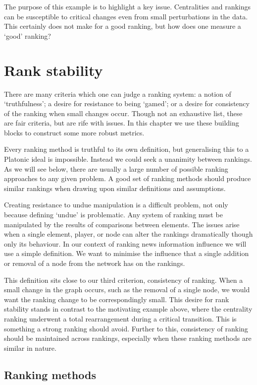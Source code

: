 The purpose of this example is to highlight a key issue. Centralities and rankings can be susceptible to critical changes even from small perturbations in the data. This certainly does not make for a good ranking, but how does one measure a `good' ranking?


\section{Rank stability}

There are many criteria which one can judge a ranking system: a notion of `truthfulness'; a desire for resistance to being `gamed'; or a desire for consistency of the ranking when small changes occur. Though not an exhaustive list, these are fair criteria, but are rife with issues. In this chapter we use these building blocks to construct some more robust metrics.

Every ranking method is truthful to its own definition, but generalising this to a Platonic ideal is impossible. Instead we could seek a unanimity between rankings. As we will see below, there are usually a large number of possible ranking approaches to any given problem. A good set of ranking methods should produce similar rankings when drawing upon similar definitions and assumptions.

Creating resistance to undue manipulation is a difficult problem, not only because defining `undue' is problematic. Any system of ranking must be manipulated by the results of comparisons between elements. The issues arise when a single element, player, or node can alter the rankings dramatically though only its behaviour. In our context of ranking news information influence we will use a simple definition. We want to minimise the influence that a single addition or removal of a node from the network has on the rankings.

This definition sits close to our third criterion, consistency of ranking. When a small change in the graph occurs, such as the removal of a single node, we would want the ranking change to be correspondingly small. This desire for rank stability stands in contrast to the motivating example above, where the centrality ranking underwent a total rearrangement during a critical transition. This is something a strong ranking should avoid. Further to this, consistency of ranking should be maintained across rankings, especially when these ranking methods are similar in nature. 


\subsection{Ranking methods}


